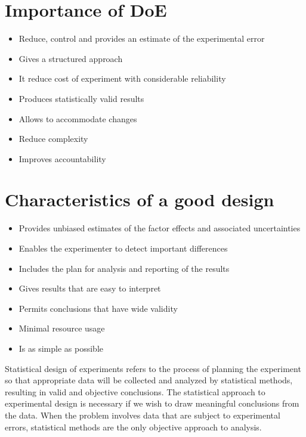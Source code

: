 \documentclass[
]{book}
\begin{document}
\hypertarget{importance-of-doe}{%
\section{Importance of DoE}\label{importance-of-doe}}

\begin{itemize}
\item
  Reduce, control and provides an estimate of the experimental error
\item
  Gives a structured approach
\item
  It reduce cost of experiment with considerable reliability\\
\item
  Produces statistically valid results
\item
  Allows to accommodate changes
\item
  Reduce complexity
\item
  Improves accountability
\end{itemize}

\hypertarget{characteristics-of-a-good-design}{%
\section{Characteristics of a good design}\label{characteristics-of-a-good-design}}

\begin{itemize}
\item
  Provides unbiased estimates of the factor effects and associated uncertainties
\item
  Enables the experimenter to detect important differences
\item
  Includes the plan for analysis and reporting of the results\\
\item
  Gives results that are easy to interpret
\item
  Permits conclusions that have wide validity
\item
  Minimal resource usage
\item
  Is as simple as possible
\end{itemize}

Statistical design of experiments refers to the process
of planning the experiment so that appropriate data
will be collected and analyzed by statistical methods,
resulting in valid and objective conclusions. The
statistical approach to experimental design is necessary
if we wish to draw meaningful conclusions from the
data. When the problem involves data that are subject
to experimental errors, statistical methods are the only
objective approach to analysis.
\end{document}
